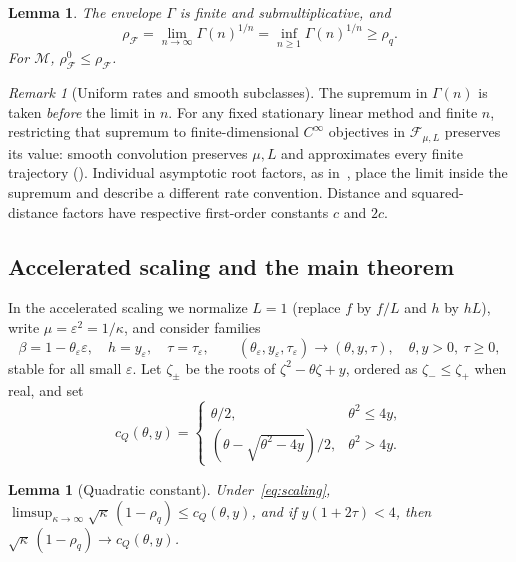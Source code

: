 \documentclass[11pt]{article}
\newtheorem{lemma}[theorem]{Lemma}
\theoremstyle{definition}
\theoremstyle{remark}
\newtheorem{remark}[theorem]{Remark}
\newcommand{\cF}{\mathcal F}
\newcommand{\cM}{\mathcal M}
\newcommand{\rhoF}{\rho_{\cF}}
\newcommand{\rhoz}{\rho_{\cF}^{0}}
\newcommand{\cQ}{c_{Q}}
\begin{document}
\begin{lemma}\label{lem:envelope}
The envelope \(\Gamma\) is finite and submultiplicative, and
\[
\rhoF=\lim_{n\to\infty}\Gamma(n)^{1/n}
=\inf_{n\ge1}\Gamma(n)^{1/n}\ge\rho_q.
\]
For \(\cM\), \(\rhoz\le\rhoF\).
\end{lemma}

\begin{remark}[Uniform rates and smooth subclasses]\label{rem:uniform-smoothness}
The supremum in \(\Gamma(n)\) is taken \emph{before} the limit in \(n\).
For any fixed stationary linear method and finite \(n\), restricting that supremum to
finite-dimensional \(C^\infty\) objectives in \(\cF_{\mu,L}\) preserves
its value: smooth convolution preserves \(\mu,L\) and approximates every
finite trajectory ().
Individual asymptotic root factors, as in~\cite{VSL25,CX26}, place the
limit inside the supremum and describe a different rate convention.  Distance and squared-distance factors have respective
first-order constants \(c\) and \(2c\).
\end{remark}

\subsection{Accelerated scaling and the main theorem}
\label{sec:quadratic}
In the accelerated scaling we normalize \(L=1\) (replace \(f\) by
\(f/L\) and \(h\) by \(hL\)), write \(\mu=\varepsilon^2=1/\kappa\), and
consider families
\begin{equation}\label{eq:scaling}
\beta=1-\theta_\varepsilon\varepsilon,\quad h=y_\varepsilon,\quad
\tau=\tau_\varepsilon,\qquad
(\theta_\varepsilon,y_\varepsilon,\tau_\varepsilon)\to(\theta,y,\tau),\quad
\theta,y>0,\ \tau\ge0,
\end{equation}
stable for all small \(\varepsilon\).  Let
\(\zeta_\pm\) be the roots of \(\zeta^2-\theta\zeta+y\), ordered as
\(\zeta_-\le\zeta_+\) when real, and set
\begin{equation}\label{eq:cQ}
\cQ(\theta,y)=\begin{cases}
\theta/2,&\theta^2\le4y,\\
(\theta-\sqrt{\theta^2-4y})/2,&\theta^2>4y.
\end{cases}
\end{equation}

\begin{lemma}[Quadratic constant]\label{lem:cq}
Under~\eqref{eq:scaling}, \(\limsup_{\kappa\to\infty}\sqrt\kappa\,(1-\rho_q)\le\cQ(\theta,y)\), and if
\(y(1+2\tau)<4\), then \(\sqrt\kappa\,(1-\rho_q)\to\cQ(\theta,y)\).
\end{lemma}
\end{document}
